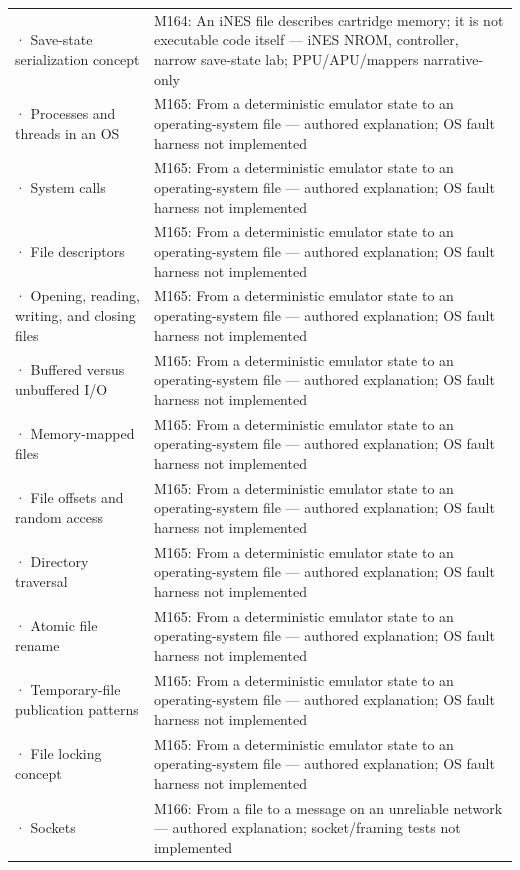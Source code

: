 {\begin{longtable}[]{@{}
  >{\raggedright\arraybackslash}p{}
  >{\raggedright\arraybackslash}p{}@{}}
2744 · Save-state serialization concept & M164: An iNES file describes cartridge memory; it is not executable code itself --- iNES NROM, controller, narrow save-state lab; PPU/APU/mappers narrative-only \\
2745 · Processes and threads in an OS & M165: From a deterministic emulator state to an operating-system file --- authored explanation; OS fault harness not implemented \\
2746 · System calls & M165: From a deterministic emulator state to an operating-system file --- authored explanation; OS fault harness not implemented \\
2747 · File descriptors & M165: From a deterministic emulator state to an operating-system file --- authored explanation; OS fault harness not implemented \\
2748 · Opening, reading, writing, and closing files & M165: From a deterministic emulator state to an operating-system file --- authored explanation; OS fault harness not implemented \\
2749 · Buffered versus unbuffered I/O & M165: From a deterministic emulator state to an operating-system file --- authored explanation; OS fault harness not implemented \\
2750 · Memory-mapped files & M165: From a deterministic emulator state to an operating-system file --- authored explanation; OS fault harness not implemented \\
2751 · File offsets and random access & M165: From a deterministic emulator state to an operating-system file --- authored explanation; OS fault harness not implemented \\
2752 · Directory traversal & M165: From a deterministic emulator state to an operating-system file --- authored explanation; OS fault harness not implemented \\
2753 · Atomic file rename & M165: From a deterministic emulator state to an operating-system file --- authored explanation; OS fault harness not implemented \\
2754 · Temporary-file publication patterns & M165: From a deterministic emulator state to an operating-system file --- authored explanation; OS fault harness not implemented \\
2755 · File locking concept & M165: From a deterministic emulator state to an operating-system file --- authored explanation; OS fault harness not implemented \\
2756 · Sockets & M166: From a file to a message on an unreliable network --- authored explanation; socket/framing tests not implemented \\

\end{longtable}}
